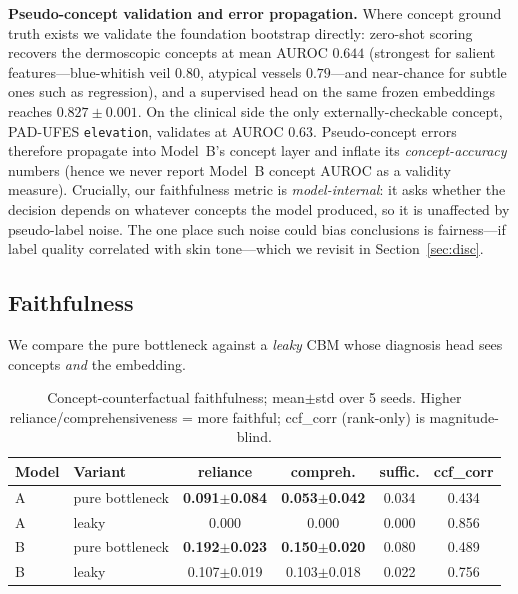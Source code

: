\documentclass{svproc}
\begin{document}
\noindent\textbf{Pseudo-concept validation and error propagation.} Where concept
ground truth exists we validate the foundation bootstrap directly: zero-shot scoring
recovers the dermoscopic concepts at mean AUROC $0.644$ (strongest for salient
features---blue-whitish veil $0.80$, atypical vessels $0.79$---and near-chance for
subtle ones such as regression), and a supervised head on the same frozen embeddings
reaches $0.827\pm0.001$. On the clinical side the only externally-checkable concept,
PAD-UFES \texttt{elevation}, validates at AUROC $0.63$. Pseudo-concept errors therefore
propagate into Model~B's concept layer and inflate its \emph{concept-accuracy} numbers
(hence we never report Model~B concept AUROC as a validity measure). Crucially, our
faithfulness metric is \emph{model-internal}: it asks whether the decision depends on
whatever concepts the model produced, so it is unaffected by pseudo-label noise. The
one place such noise could bias conclusions is fairness---if label quality correlated
with skin tone---which we revisit in Section~\ref{sec:disc}.

\subsection{Faithfulness}
We compare the pure bottleneck against a \emph{leaky} CBM whose diagnosis head sees
concepts \emph{and} the embedding.

\begin{table}[t]
\caption{Concept-counterfactual faithfulness; mean$\pm$std over 5 seeds. Higher
reliance/comprehensiveness = more faithful; ccf\_corr (rank-only) is magnitude-blind.}
\label{tab:exp2}
\begin{center}
\begin{tabular}{llcccc}
\hline\rule{0pt}{12pt}
Model & Variant & reliance & compreh. & suffic. & ccf\_corr\\[2pt]
\hline\rule{0pt}{12pt}
A & pure bottleneck & \textbf{0.091$\pm$0.084} & \textbf{0.053$\pm$0.042} & 0.034 & 0.434\\
A & leaky & 0.000 & 0.000 & 0.000 & 0.856\\
B & pure bottleneck & \textbf{0.192$\pm$0.023} & \textbf{0.150$\pm$0.020} & 0.080 & 0.489\\
B & leaky & 0.107$\pm$0.019 & 0.103$\pm$0.018 & 0.022 & 0.756\\[2pt]
\hline
\end{tabular}
\end{center}
\end{table}
\end{document}

